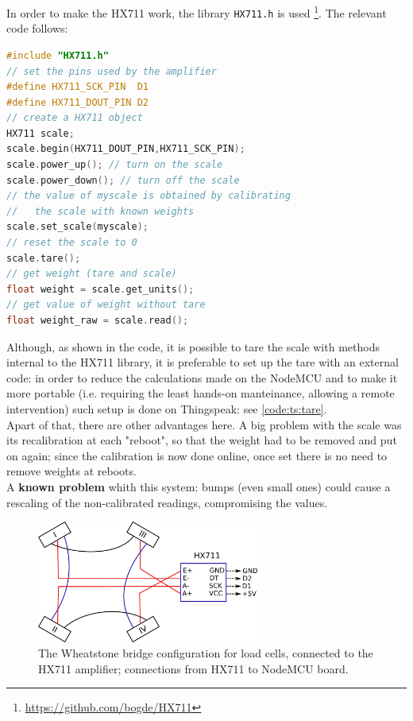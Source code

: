 In order to make the HX711 work, the library \texttt{HX711.h} is used \footnote{\url{https://github.com/bogde/HX711}}. The relevant code follows:
\begin{lstlisting}[language=C]
#include "HX711.h"
// set the pins used by the amplifier
#define HX711_SCK_PIN  D1         
#define HX711_DOUT_PIN D2
// create a HX711 object
HX711 scale;                      
scale.begin(HX711_DOUT_PIN,HX711_SCK_PIN);
scale.power_up(); // turn on the scale
scale.power_down(); // turn off the scale
// the value of myscale is obtained by calibrating 
//   the scale with known weights
scale.set_scale(myscale);         
// reset the scale to 0
scale.tare();                     
// get weight (tare and scale)
float weight = scale.get_units(); 
// get value of weight without tare 
float weight_raw = scale.read();
\end{lstlisting}

\label{topic:scale_tare}
Although, as shown in the code, it is possible to tare the scale with methods internal to the HX711 library, it is preferable to set up the tare with an external code: in order to reduce the calculations made on the NodeMCU and to make it more portable (i.e. requiring the least hands-on manteinance, allowing a remote intervention) such setup is done on Thingspeak: see \autoref{code:ts:tare}. \\
Apart of that, there are other advantages here. A big problem with the scale was its recalibration at each "reboot", so that the weight had to be removed and put on again; since the calibration is now done online, once set there is no need to remove weights at reboots. \\

A \textbf{known problem} whith this system: bumps (even small ones) could cause a rescaling of the non-calibrated readings, compromising the values. 

\begin{figure}[!htb] 
  \centering
  \includegraphics[width=0.65\textwidth]{latex/img/loadcells_scheme.png}
  \caption{The Wheatstone bridge configuration for load cells, connected to the HX711 amplifier; connections from HX711 to NodeMCU board.}\label{img:loadcells_scheme}
\end{figure}



